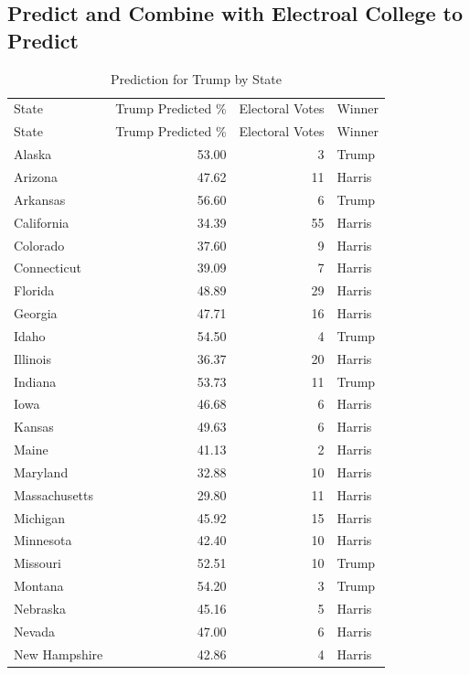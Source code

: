 \documentclass[
  letterpaper,
  DIV=11,
  numbers=noendperiod]{scrartcl}
\begin{document}
\subsection{Predict and Combine with Electroal College to
Predict}\label{predict-and-combine-with-electroal-college-to-predict}

\begin{longtable}[]{@{}lrrl@{}}

\caption{\label{tbl-prediction}Prediction for Trump}

\tabularnewline

\caption{Prediction for Trump by State}\tabularnewline
\toprule\noalign{}
State & Trump Predicted \% & Electoral Votes & Winner \\
\midrule\noalign{}
\endfirsthead
\toprule\noalign{}
State & Trump Predicted \% & Electoral Votes & Winner \\
\midrule\noalign{}
\endhead
\bottomrule\noalign{}
\endlastfoot
Alaska & 53.00 & 3 & Trump \\
Arizona & 47.62 & 11 & Harris \\
Arkansas & 56.60 & 6 & Trump \\
California & 34.39 & 55 & Harris \\
Colorado & 37.60 & 9 & Harris \\
Connecticut & 39.09 & 7 & Harris \\
Florida & 48.89 & 29 & Harris \\
Georgia & 47.71 & 16 & Harris \\
Idaho & 54.50 & 4 & Trump \\
Illinois & 36.37 & 20 & Harris \\
Indiana & 53.73 & 11 & Trump \\
Iowa & 46.68 & 6 & Harris \\
Kansas & 49.63 & 6 & Harris \\
Maine & 41.13 & 2 & Harris \\
Maryland & 32.88 & 10 & Harris \\
Massachusetts & 29.80 & 11 & Harris \\
Michigan & 45.92 & 15 & Harris \\
Minnesota & 42.40 & 10 & Harris \\
Missouri & 52.51 & 10 & Trump \\
Montana & 54.20 & 3 & Trump \\
Nebraska & 45.16 & 5 & Harris \\
Nevada & 47.00 & 6 & Harris \\
New Hampshire & 42.86 & 4 & Harris \\

\end{longtable}
\end{document}
